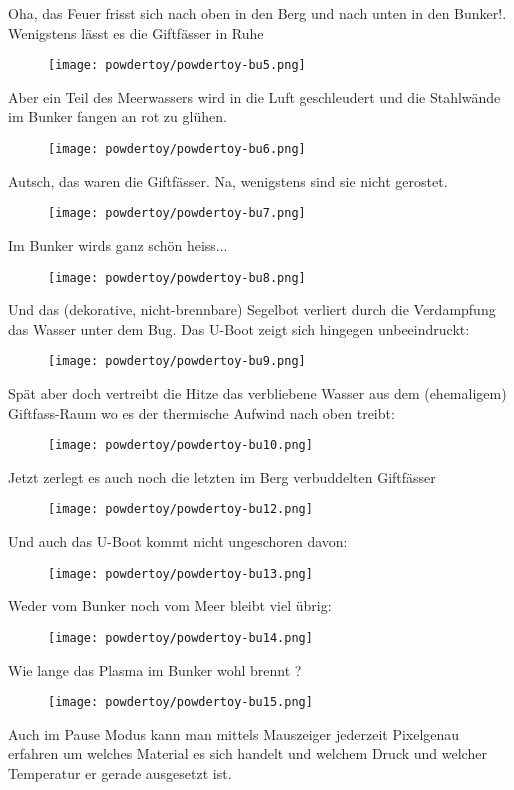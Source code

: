 Oha, das Feuer frisst sich nach oben in den Berg und nach unten in den Bunker!. Wenigstens lässt es die Giftfässer in Ruhe
\begin{figure}
\texttt{[image: powdertoy/powdertoy-bu5.png]}
\end{figure}
Aber ein Teil des Meerwassers wird in die Luft geschleudert und die Stahlwände im Bunker fangen an rot zu glühen.
\begin{figure}
\texttt{[image: powdertoy/powdertoy-bu6.png]}
\end{figure}
Autsch, das waren die Giftfässer. Na, wenigstens sind sie nicht gerostet.
\begin{figure}
\texttt{[image: powdertoy/powdertoy-bu7.png]}
\end{figure}
Im Bunker wirds ganz schön heiss...
\begin{figure}
\texttt{[image: powdertoy/powdertoy-bu8.png]}
\end{figure}
Und das (dekorative, nicht-brennbare) Segelbot verliert durch die Verdampfung das Wasser unter dem Bug. Das U-Boot zeigt sich hingegen unbeeindruckt:
\begin{figure}
\texttt{[image: powdertoy/powdertoy-bu9.png]}
\end{figure}
Spät aber doch vertreibt die Hitze das verbliebene Wasser aus dem (ehemaligem) Giftfass-Raum wo es der thermische Aufwind nach oben treibt:
\begin{figure}
\texttt{[image: powdertoy/powdertoy-bu10.png]}
\end{figure}
Jetzt zerlegt es auch noch die letzten im Berg verbuddelten Giftfässer
\begin{figure}
\texttt{[image: powdertoy/powdertoy-bu12.png]}
\end{figure}
Und auch das U-Boot kommt nicht ungeschoren davon:
\begin{figure}
\texttt{[image: powdertoy/powdertoy-bu13.png]}
\end{figure}
Weder vom Bunker noch vom Meer bleibt viel übrig:
\begin{figure}
\texttt{[image: powdertoy/powdertoy-bu14.png]}
\end{figure}
Wie lange das Plasma im Bunker wohl brennt ?
\begin{figure}
\texttt{[image: powdertoy/powdertoy-bu15.png]}
\end{figure}
Auch im Pause Modus kann man mittels Mauszeiger jederzeit Pixelgenau erfahren um welches Material es sich handelt und welchem Druck und welcher Temperatur er gerade ausgesetzt ist. 

